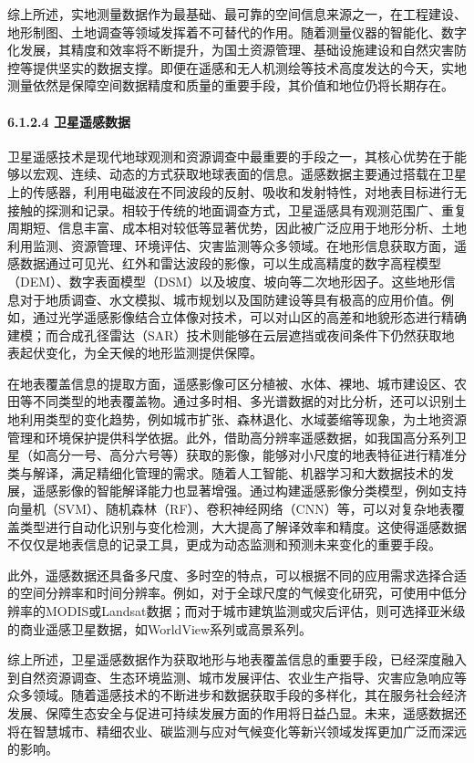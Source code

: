 综上所述，实地测量数据作为最基础、最可靠的空间信息来源之一，在工程建设、地形制图、土地调查等领域发挥着不可替代的作用。随着测量仪器的智能化、数字化发展，其精度和效率将不断提升，为国土资源管理、基础设施建设和自然灾害防控等提供坚实的数据支撑。即便在遥感和无人机测绘等技术高度发达的今天，实地测量依然是保障空间数据精度和质量的重要手段，其价值和地位仍将长期存在。

\paragraph{6.1.2.4 卫星遥感数据}\label{ux536bux661fux9065ux611fux6570ux636e}

卫星遥感技术是现代地球观测和资源调查中最重要的手段之一，其核心优势在于能够以宏观、连续、动态的方式获取地球表面的信息。遥感数据主要通过搭载在卫星上的传感器，利用电磁波在不同波段的反射、吸收和发射特性，对地表目标进行无接触的探测和记录。相较于传统的地面调查方式，卫星遥感具有观测范围广、重复周期短、信息丰富、成本相对较低等显著优势，因此被广泛应用于地形分析、土地利用监测、资源管理、环境评估、灾害监测等众多领域。在地形信息获取方面，遥感数据通过可见光、红外和雷达波段的影像，可以生成高精度的数字高程模型（DEM）、数字表面模型（DSM）以及坡度、坡向等二次地形因子。这些地形信息对于地质调查、水文模拟、城市规划以及国防建设等具有极高的应用价值。例如，通过光学遥感影像结合立体像对技术，可以对山区的高差和地貌形态进行精确建模；而合成孔径雷达（SAR）技术则能够在云层遮挡或夜间条件下仍然获取地表起伏变化，为全天候的地形监测提供保障。

在地表覆盖信息的提取方面，遥感影像可区分植被、水体、裸地、城市建设区、农田等不同类型的地表覆盖物。通过多时相、多光谱数据的对比分析，还可以识别土地利用类型的变化趋势，例如城市扩张、森林退化、水域萎缩等现象，为土地资源管理和环境保护提供科学依据。此外，借助高分辨率遥感数据，如我国高分系列卫星（如高分一号、高分六号等）获取的影像，能够对小尺度的地表特征进行精准分类与解译，满足精细化管理的需求。随着人工智能、机器学习和大数据技术的发展，遥感影像的智能解译能力也显著增强。通过构建遥感影像分类模型，例如支持向量机（SVM）、随机森林（RF）、卷积神经网络（CNN）等，可以对复杂地表覆盖类型进行自动化识别与变化检测，大大提高了解译效率和精度。这使得遥感数据不仅仅是地表信息的记录工具，更成为动态监测和预测未来变化的重要手段。

此外，遥感数据还具备多尺度、多时空的特点，可以根据不同的应用需求选择合适的空间分辨率和时间分辨率。例如，对于全球尺度的气候变化研究，可使用中低分辨率的MODIS或Landsat数据；而对于城市建筑监测或灾后评估，则可选择亚米级的商业遥感卫星数据，如WorldView系列或高景系列。

综上所述，卫星遥感数据作为获取地形与地表覆盖信息的重要手段，已经深度融入到自然资源调查、生态环境监测、城市发展评估、农业生产指导、灾害应急响应等众多领域。随着遥感技术的不断进步和数据获取手段的多样化，其在服务社会经济发展、保障生态安全与促进可持续发展方面的作用将日益凸显。未来，遥感数据还将在智慧城市、精细农业、碳监测与应对气候变化等新兴领域发挥更加广泛而深远的影响。

